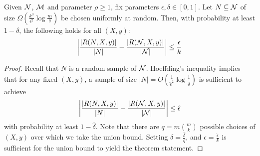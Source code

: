 \begin{theorem}
\label{thm:sampling}
Given $\mathcal {N}$, $\mathcal{M}$ and parameter $\rho \ge 1$, fix parameters $\epsilon, \delta \in [0,1]$. Let $N \subseteq \mathcal {N}$ of size $\Omega\left(\frac{k^3}{\epsilon^2} \log \frac{m}{\delta}\right)$ be chosen uniformly at random. Then, with probability at least $1-\delta$, the following holds for all $(X,y)$:
$$ \left| \frac{| R(N,X,y) |}{|N|} - \frac{| R(\mathcal {N},X,y)  |}{|\mathcal {N}|} \right| \le \frac{\epsilon}{k}$$	
\end{theorem}
\begin{proof}
	Recall that $N$ is a random sample of $\mathcal {N}$. Hoeffding's inequality implies that for any fixed $(X,y)$, a sample of size $|N| = O\left( \frac{1}{\hat{\epsilon}^2} \log \frac{1}{\hat{\delta}} \right)$ is sufficient to achieve
$$  \left| \frac{| R(N, X,y) |}{|N|} - \frac{| R(\mathcal {N}, X, y)  |}{|\mathcal {N}|} \right| \le \hat{\epsilon}$$ 
with probability at least $1-\hat{\delta}$. Note that there are $q = m {m \choose k}$ possible choices of $(X,y)$ over which we take the union bound. Setting $\delta = \frac{\hat{\delta}}{q}$, and $\epsilon = \frac{\hat{\epsilon}}{k}$ is sufficient for the union bound to yield the theorem statement.
\end{proof}
\iffalse
